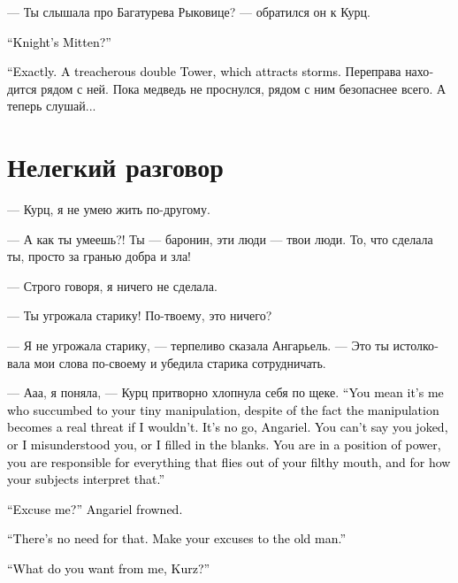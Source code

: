 \documentclass[a4paper,12pt,fleqn]{book}\usepackage{cooltooltips}\usepackage{polyglossia}\setdefaultlanguage[babelshorthands=true]{russian}\setotherlanguage{english}\defaultfontfeatures{Ligatures=TeX,Mapping=tex-text} \usepackage{xcolor}\definecolor{lightgray}{HTML}{bbbbbb}\color{lightgray}\newcommand{\ml}[3]{\textenglish{\textcolor{black}{#3}}}
\begin{document}
--- Ты слышала про Багатурева Рыковице? --- обратился он к Курц.

\ml{$0$}
{--- Перчатка Рыцаря?}
{``Knight's Mitten?''}

\ml{$0$}
{--- Именно.}
{``Exactly.}
\ml{$0$}
{Коварная двойная Башня, которая притягивает бури.}
{A treacherous double Tower, which attracts storms.}
Переправа находится рядом с ней.
Пока медведь не проснулся, рядом с ним безопаснее всего.
А теперь слушай...

\section{Нелегкий разговор}

--- Курц, я не умею жить по-другому.

--- А как ты умеешь?!
Ты --- баронин, эти люди --- твои люди.
То, что сделала ты, просто за гранью добра и зла!

--- Строго говоря, я ничего не сделала.

--- Ты угрожала старику!
По-твоему, это ничего?

--- Я не угрожала старику, --- терпеливо сказала Ангарьель.
--- Это ты истолковала мои слова по-своему и убедила старика сотрудничать.

--- Ааа, я поняла, --- Курц притворно хлопнула себя по щеке.
\ml{$0$}
{--- То есть это я поддалась на твою маленькую манипуляцию, с тем нюансом, что если бы я не поддалась, то манипуляция превратилась бы в реальную угрозу.}
{``You mean it's me who succumbed to your tiny manipulation, despite of the fact the manipulation becomes a real threat if I wouldn't.}
\ml{$0$}
{Это так не работает, Ангарьель.}
{It's no go, Angariel.}
\ml{$0$}
{Ты не можешь сказать, что ты пошутила, что я тебя не так поняла, что я додумала твои слова.}
{You can't say you joked, or I misunderstood you, or I filled in the blanks.}
\ml{$0$}
{Ты на позиции силы и несёшь ответственность за всё, что вылетает из твоего поганого рта, и за то, как твои подчинённые это истолковывают.}
{You are in a position of power, you are responsible for everything that flies out of your filthy mouth, and for how your subjects interpret that.''}

\ml{$0$}
{--- Прости? --- нахмурилась Ангарьель.}
{``Excuse me?'' Angariel frowned.}

\ml{$0$}
{--- Не извиняйся передо мной.}
{``There's no need for that.}
\ml{$0$}
{Лучше перед стариком иди извинись.}
{Make your excuses to the old man.''}

\ml{$0$}
{--- Что ты от меня хочешь, Курц?}
{``What do you want from me, Kurz?''}
\end{document}
